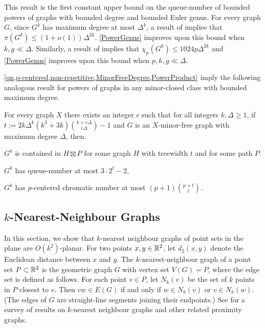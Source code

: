 \documentclass{patmorin}
\newcommand{\note}[2]{\noindent{\color{red}[#1:~#2]}}
\renewcommand{\le}{\leqslant}
\renewcommand{\geq}{\geqslant}
\renewcommand{\leq}{\leqslant}
\begin{document}
\note{DW}{\cref{PowerGenus} has been updated}

This result is the first constant upper bound on the queue-number of bounded powers of graphs with bounded degree and bounded Euler genus.  For every graph $G$, since $G^k$ has maximum degree at most $\Delta^k$, a result of \citet{DJKW16} implies that $\pi(G^k) \leq (1+o(1))\Delta^{2k}$. \cref{PowerGenus} improves upon this bound when $k,g\ll\Delta$.  Similarly, a result of \citet{DFMS21} implies that $\chi_p(G^k)\le 1024p\Delta^{2k}$ and \cref{PowerGenus} improves upon this bound when $p,k,g\ll\Delta$.

\cref{qn,p-centered,non-repetitive,MinorFreeDegree,PowerProduct} imply the following analogous result for powers of graphs in any minor-closed class with bounded maximum degree.

\begin{thm}
\label{PowerMinor}
For every graph $X$ there exists an integer $c$ such that for all integers $k,\Delta\geq 1$, if $t:= 2k\Delta^{k}(k^3+3k)\binom{k+c\Delta}{c\Delta}-1$ and $G$ is an $X$-minor-free graph with maximum degree $\Delta$, then:
\begin{compactitem}
	\item $G^k$ is contained in $H\boxtimes P$ for some graph $H$ with treewidth $t$ and for some path $P$.
	\item $G^k$ has queue-number at most $3\cdot 2^t-2$,
	\item $G^k$ has $p$-centered chromatic number at most $(p+1)\binom{p+t}{t}$.
\end{compactitem}
\end{thm}

\subsection{$k$-Nearest-Neighbour Graphs}

In this section, we show that $k$-nearest neighbour graphs of point sets in the plane are $O(k^2)$-planar.  For two points $x,y\in\mathbb{R}^2$, let $d_2(x,y)$ denote the Euclidean distance between $x$ and $y$. The $k$-nearest-neighbour graph of a point set $P\subset\mathbb{R}^2$ is the geometric graph $G$ with vertex set $V(G)=P$, where the edge set is defined as follows. For each point $v\in P$, let $N_k(v)$ be the set of $k$ points in $P$ closest to $v$. Then $vw\in E(G)$ if and only if $w\in N_k(v)$ or $v\in N_k(w)$. (The edges of $G$ are straight-line segments joining their endpoints.) See \citep{ProximityGraphs} for a survey of results on $k$-nearest neighbour graphs and other related proximity graphs.
\end{document}
